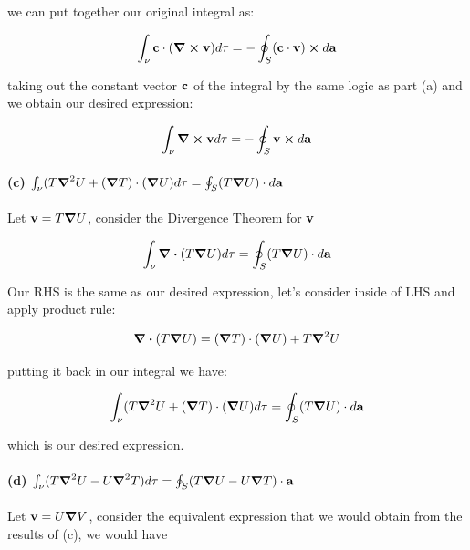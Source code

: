 \documentclass{article}
\numberwithin{equation}{section}
\begin{document}
we can put together our original integral as:

\begin{equation}
    \int_\nu \vb{c \cdot (\curl v)} d \tau = -  \oint_S (\vb{c \cdot v}) \cross d \vb{a}
\end{equation}

taking out the constant vector $\vb{c}$ of the integral by the same logic as part (a) and we obtain our desired expression:

\begin{equation}
    \int_\nu \vb{\curl v} d \tau= -  \oint_S \vb{v} \cross d \vb{a}
\end{equation}

\paragraph{(c) $\int_\nu (T \grad^2 U + (\grad T) \cdot (\grad U) d \tau = \oint_S (T \grad U) \cdot d\vb{a}$ \\}

Let $\vb{v} = T \grad U$, consider the Divergence Theorem for $\vb{v}$

\begin{equation}
    \int_\nu \div (T \grad U) d \tau =\oint_S (T \grad U) \cdot d \vb{a}
\end{equation}

Our RHS is the same as our desired expression, let's consider inside of LHS and apply product rule:

\begin{equation}
    \div (T \grad U) = (\grad T) \cdot (\grad U) + T \grad^2 U 
\end{equation}

putting it back in our integral we have:

\begin{equation}
    \int_\nu ( T \grad^2 U + (\grad T) \cdot (\grad U) d \tau = \oint_S (T \grad U) \cdot d \vb{a}
\end{equation}

which is our desired expression.

\paragraph{(d) $\int_\nu (T \grad^2 U - U \grad^2 T) d \tau = \oint_S (T \grad U  - U \grad T )\cdot \vb{a}$ \\}

Let $\vb{v} = U \grad V$, consider the equivalent expression that we would obtain from the results of (c), we would have 
\end{document}
